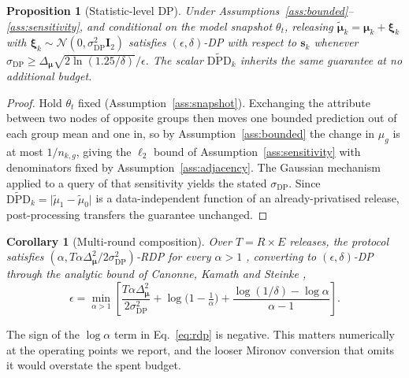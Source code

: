 \documentclass[preprint,12pt]{elsarticle}
\theoremstyle{plain}
\newtheorem{proposition}[theorem]{Proposition}
\newtheorem{corollary}[theorem]{Corollary}
\theoremstyle{definition}
\theoremstyle{remark}
\newcommand{\dpd}{\mathrm{DPD}}
\begin{document}
\begin{proposition}[Statistic-level DP]\label{prop:dp}
Under Assumptions~\ref{ass:bounded}--\ref{ass:sensitivity}, and conditional on the model snapshot $\theta_t$, releasing $\tilde{\bm{\mu}}_k = \bm{\mu}_k + \bm{\xi}_k$ with $\bm{\xi}_k \sim \mathcal{N}(0,\sigma_{\mathrm{DP}}^2 \bm{I}_2)$ satisfies $(\epsilon,\delta)$-DP with respect to $\bm{s}_k$ whenever $\sigma_{\mathrm{DP}} \ge \Delta_{\bm{\mu}}\sqrt{2\ln(1.25/\delta)}/\epsilon$. The scalar $\widetilde{\dpd}_k$ inherits the same guarantee at no additional budget.
\end{proposition}

\begin{proof}
Hold $\theta_t$ fixed (Assumption~\ref{ass:snapshot}). Exchanging the attribute between two nodes of opposite groups then moves one bounded prediction out of each group mean and one in, so by Assumption~\ref{ass:bounded} the change in $\mu_g$ is at most $1/n_{k,g}$, giving the $\ell_2$ bound of Assumption~\ref{ass:sensitivity} with denominators fixed by Assumption~\ref{ass:adjacency}. The Gaussian mechanism \cite[Thm.~A.1]{dwork2014algorithmic} applied to a query of that sensitivity yields the stated $\sigma_{\mathrm{DP}}$. Since $\widetilde{\dpd}_k = \lvert\tilde{\mu}_1 - \tilde{\mu}_0\rvert$ is a data-independent function of an already-privatised release, post-processing \cite[Prop.~2.1]{dwork2014algorithmic} transfers the guarantee unchanged.
\end{proof}

\begin{corollary}[Multi-round composition]\label{cor:rdp}
Over $T = R \times E$ releases, the protocol satisfies $(\alpha, T\alpha\Delta_{\bm{\mu}}^2/2\sigma_{\mathrm{DP}}^2)$-RDP for every $\alpha > 1$ \cite{mironov2017renyi}, converting to $(\epsilon,\delta)$-DP through the analytic bound of Canonne, Kamath and Steinke \cite{canonne2020discrete},
\begin{equation}
\epsilon = \min_{\alpha>1}\left[\frac{T\alpha\Delta_{\bm{\mu}}^2}{2\sigma_{\mathrm{DP}}^2} + \log\!\Big(1-\tfrac{1}{\alpha}\Big) + \frac{\log(1/\delta) - \log\alpha}{\alpha - 1}\right].
\label{eq:rdp}
\end{equation}
\end{corollary}

\noindent The sign of the $\log\alpha$ term in Eq.~\eqref{eq:rdp} is negative. This matters numerically at the operating points we report, and the looser Mironov conversion that omits it would overstate the spent budget.
\end{document}
